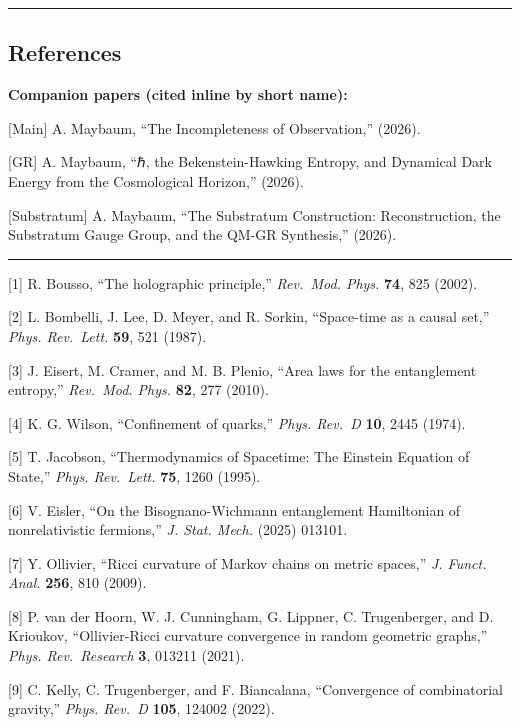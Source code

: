 \documentclass[
]{article}
\begin{document}
\begin{center}\rule{0.5\linewidth}{0.5pt}\end{center}

\hypertarget{references}{%
\subsection{References}\label{references}}

\textbf{Companion papers (cited inline by short name):}

{[}Main{]} A. Maybaum, ``The Incompleteness of Observation,'' (2026).

{[}GR{]} A. Maybaum, ``ℏ, the Bekenstein-Hawking Entropy, and Dynamical
Dark Energy from the Cosmological Horizon,'' (2026).

{[}Substratum{]} A. Maybaum, ``The Substratum Construction:
Reconstruction, the Substratum Gauge Group, and the QM-GR Synthesis,''
(2026).

\begin{center}\rule{0.5\linewidth}{0.5pt}\end{center}

{[}1{]} R. Bousso, ``The holographic principle,'' \emph{Rev.~Mod. Phys.}
\textbf{74}, 825 (2002).

{[}2{]} L. Bombelli, J. Lee, D. Meyer, and R. Sorkin, ``Space-time as a
causal set,'' \emph{Phys. Rev.~Lett.} \textbf{59}, 521 (1987).

{[}3{]} J. Eisert, M. Cramer, and M. B. Plenio, ``Area laws for the
entanglement entropy,'' \emph{Rev.~Mod. Phys.} \textbf{82}, 277 (2010).

{[}4{]} K. G. Wilson, ``Confinement of quarks,'' \emph{Phys. Rev.~D}
\textbf{10}, 2445 (1974).

{[}5{]} T. Jacobson, ``Thermodynamics of Spacetime: The Einstein
Equation of State,'' \emph{Phys. Rev.~Lett.} \textbf{75}, 1260 (1995).

{[}6{]} V. Eisler, ``On the Bisognano-Wichmann entanglement Hamiltonian
of nonrelativistic fermions,'' \emph{J. Stat. Mech.} (2025) 013101.

{[}7{]} Y. Ollivier, ``Ricci curvature of Markov chains on metric
spaces,'' \emph{J. Funct. Anal.} \textbf{256}, 810 (2009).

{[}8{]} P. van der Hoorn, W. J. Cunningham, G. Lippner, C. Trugenberger,
and D. Krioukov, ``Ollivier-Ricci curvature convergence in random
geometric graphs,'' \emph{Phys. Rev.~Research} \textbf{3}, 013211
(2021).

{[}9{]} C. Kelly, C. Trugenberger, and F. Biancalana, ``Convergence of
combinatorial gravity,'' \emph{Phys. Rev.~D} \textbf{105}, 124002
(2022).
\end{document}
